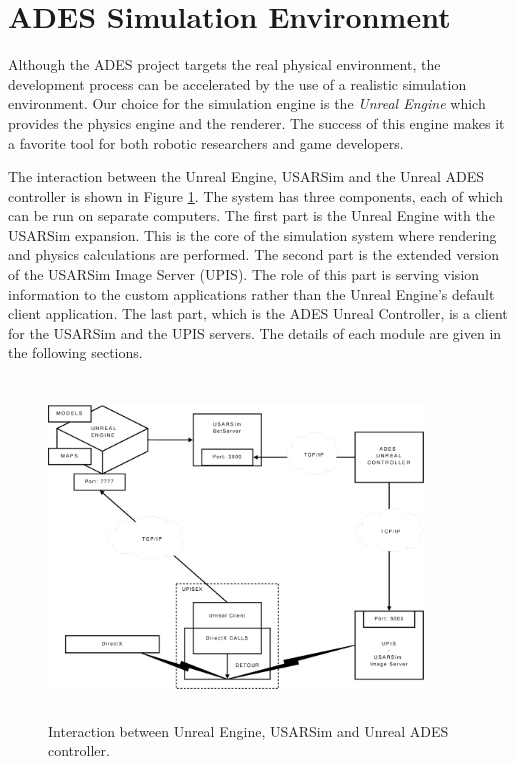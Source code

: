 \documentclass[a4paper,oneside,12pt]{report}
\begin{document}
\section{ADES Simulation Environment}
Although the ADES project targets the real physical environment, the development process can be accelerated by the use of a realistic simulation environment. Our choice for the simulation engine is the \textit{Unreal Engine} which provides the physics engine and the renderer. The success of this engine makes it a favorite tool for both robotic researchers and game developers. 

The interaction between the Unreal Engine, USARSim and the Unreal ADES controller is shown in Figure \ref{fig:unrealades}. The system has three components, each of which can be run on separate computers. The first part is the Unreal Engine with the USARSim expansion. This is the core of the simulation system where rendering and physics calculations are performed. The second part is the extended version of the USARSim Image Server (UPIS). The role of this part is serving vision information to the custom applications rather than the Unreal Engine's default client application. The last part, which is the ADES Unreal Controller, is a client for the USARSim and the UPIS servers. The details of each module are given in the following sections.

\begin{figure}[ht]
\begin{center}
\includegraphics[width=100mm,height=90mm]{img/unrealades.eps}
\caption{Interaction between Unreal Engine, USARSim and Unreal ADES controller.}
\label{fig:unrealades}
\end{center}
\end{figure}
\end{document}
